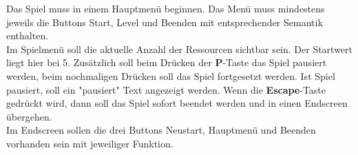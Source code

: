 Das Spiel \gameTitle muss in einem Hauptmenü beginnen. Das Menü muss mindestens jeweils die Buttons \glqq Start\grqq{}, \glqq Level\grqq{} und \glqq Beenden\grqq{} mit entsprechender Semantik enthalten. \\
Im Spielmen\"u soll die aktuelle Anzahl der Ressourcen sichtbar sein. Der Startwert liegt hier bei 5.
Zusätzlich soll beim Drücken der \textbf{P}-Taste das Spiel pausiert werden,	beim nochmaligen Drücken soll das Spiel fortgesetzt werden.
Ist Spiel pausiert, soll ein "pausiert" Text angezeigt werden.
Wenn die \textbf{Escape}-Taste gedrückt wird, dann soll das Spiel sofort beendet werden und in einen Endscreen übergehen.\\
Im Endscreen sollen die drei Buttons \glqq Neustart\grqq{}, \glqq Hauptmen\"u\grqq{} und \glqq Beenden\grqq{} vorhanden sein mit jeweiliger Funktion. 
